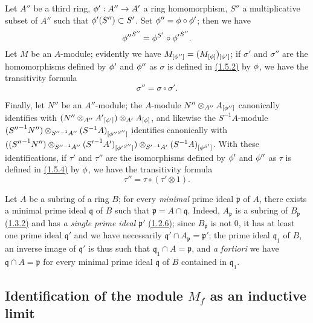 \begin{env}[1.5.7]
\label{env-0.1.5.7}
Let $A''$ be a third ring, $\phi':A''\to A'$ a ring homomorphism, $S''$ a
multiplicative subset of $A''$ such that $\phi'(S'')\subset S'$. Set
$\phi''=\phi\circ\phi'$; then we have
\[
  {\phi''}^{S''}=\phi^{S'}\circ{\phi'}^{S''}.
\]
Let $M$ be an $A$-module; evidently we have
$M_{[\phi'']}=(M_{[\phi]})_{[\phi']}$; if $\sigma'$ and $\sigma''$ are the
homomorphisms defined by $\phi'$ and $\phi''$ as $\sigma$ is defined in
\hyperref[env-0.1.5.2]{(1.5.2)} by $\phi$, we have the transitivity formula
\[
  \sigma''=\sigma\circ\sigma'.
\]

Finally, let $N''$ be an $A''$-module; the $A$-module
$N''\otimes_{A''}A_{[\phi'']}$ canonically identifies with
$(N''\otimes_{A''}{A'}_{[\phi']})\otimes_{A'}A_{[\phi]}$, and likewise the
$S^{-1}A$-module
$({S''}^{-1}N'')\otimes_{{S''}^{-1}A''}(S^{-1}A)_{[{\phi''}^{S''}]}$ identifies
canonically with
$(({S''}^{-1}N'')\otimes_{{S''}^{-1}A''}({S'}^{-1}A')_{[{\phi'}^{S''}]})
  \otimes_{{S'}^{-1}A'}(S^{-1}A)_{[\phi^{S'}]}$. With these identifications, if
$\tau'$ and $\tau''$ are the isomorphisms defined by $\phi'$ and $\phi''$ as
$\tau$ is defined in \hyperref[env-0.1.5.4]{(1.5.4)} by $\phi$, we have the transitivity
formula
\[
  \tau''=\tau\circ(\tau'\otimes 1).
\]
\end{env}

\begin{env}[1.5.8]
\label{env-0.1.5.8}
Let $A$ be a subring of a ring $B$; for every {\em minimal} prime ideal
$\mathfrak{p}$ of $A$, there exists a minimal prime ideal $\mathfrak{q}$ of $B$
such that $\mathfrak{p}=A\cap\mathfrak{q}$. Indeed, $A_\mathfrak{p}$ is a
subring of $B_\mathfrak{p}$ \hyperref[env-0.1.3.2]{(1.3.2)} and has {\em a single prime
ideal $\mathfrak{p}'$} \hyperref[env-0.1.2.6]{(1.2.6)}; since $B_\mathfrak{p}$ is not
$0$, it has at least one prime ideal $\mathfrak{q}'$ and we have necessarily
$\mathfrak{q}'\cap A_\mathfrak{p}=\mathfrak{p}'$; the prime ideal
$\mathfrak{q}_1$ of $B$, an inverse image of $\mathfrak{q}'$ is thus such that
$\mathfrak{q}_1\cap A=\mathfrak{p}$, and {\em a fortiori} we have
$\mathfrak{q}\cap A=\mathfrak{p}$ for every minimal prime ideal $\mathfrak{q}$
of $B$ contained in $\mathfrak{q}_1$.
\end{env}

\subsection{Identification of the module $M_f$ as an inductive limit}
\label{subsection-localization-as-inductive-limit}

